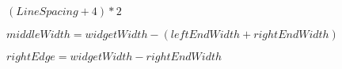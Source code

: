 \documentclass{article}
\begin{document}
$ (LineSpacing + 4) {*} 2 $
\pagebreak

$ middleWidth=widgetWidth-(leftEndWidth+rightEndWidth) $
\pagebreak

$ rightEdge=widgetWidth-rightEndWidth $
\pagebreak
\end{document}
